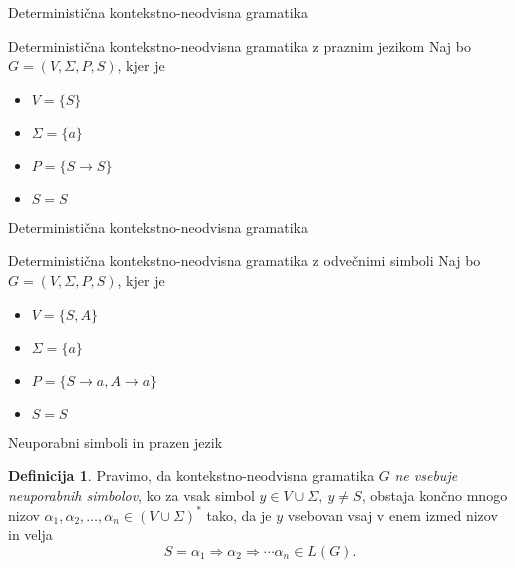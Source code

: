 \documentclass{beamer}
\theoremstyle{definition} %
\newtheorem{definicija}{Definicija}[section]
\begin{document}
\begin{frame}{Deterministična kontekstno-neodvisna gramatika}
    \begin{exampleblock}{Deterministična kontekstno-neodvisna gramatika z praznim jezikom}
        Naj bo $ G = ( V, \Sigma, P, S ) $, kjer je 
        \begin{itemize}
            \item<2-> $ V = \{ S \} $
            \item<3-> $ \Sigma = \{ a \} $
            \item<4-> $P = \{ S \rightarrow S \} $
            \item<5-> $ S = S $
        \end{itemize}
        \pause
    \end{exampleblock}
\end{frame}

\begin{frame}{Deterministična kontekstno-neodvisna gramatika}
    \begin{exampleblock}{Deterministična kontekstno-neodvisna gramatika z odvečnimi simboli}
        Naj bo $ G = ( V, \Sigma, P, S ) $, kjer je 
        \begin{itemize}
            \item $ V = \{ S, A \} $
            \item $ \Sigma = \{ a \} $
            \item $P = \{ S \rightarrow a, A \rightarrow a \} $
            \item $ S = S $
        \end{itemize}
        \pause
    \end{exampleblock}
\end{frame}

\begin{frame}{Neuporabni simboli in prazen jezik}
    \begin{definicija}
        Pravimo, da kontekstno-neodvisna gramatika $G$ \textit{ne vsebuje neuporabnih simbolov}, ko za vsak simbol
        $ y \in V \cup \Sigma, \ y \neq S $, obstaja končno mnogo nizov $ \alpha_1, \alpha_2, \ldots, \alpha_n \in 
        (V \cup \Sigma)^* $ tako, da je $y$ vsebovan vsaj v enem izmed nizov in velja
        \[
            S = \alpha_1 \Rightarrow \alpha_2 \Rightarrow \cdots \alpha_n \in L(G).
        \] 
    \end{definicija}
\end{frame}
\end{document}
